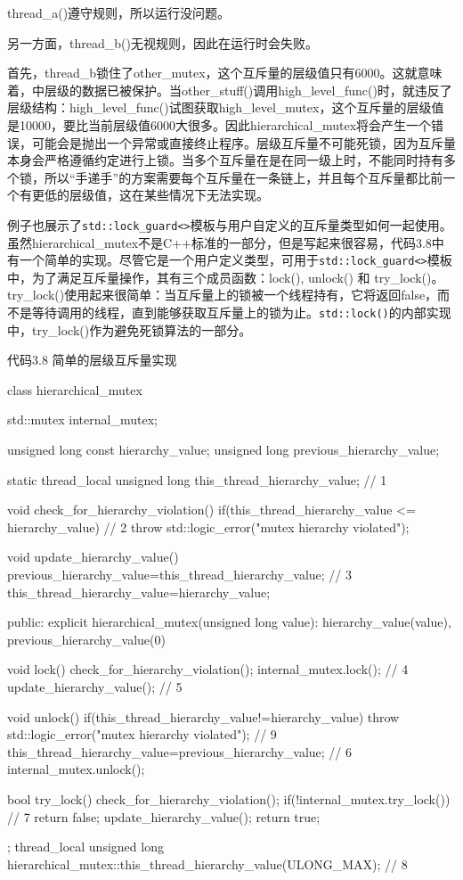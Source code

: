 thread\_a()遵守规则，所以运行没问题。

另一方面，thread\_b()无视规则，因此在运行时会失败。

首先，thread\_b锁住了other\_mutex，这个互斥量的层级值只有6000。这就意味着，中层级的数据已被保护。当other\_stuff()调用high\_level\_func()时，就违反了层级结构：high\_level\_func()试图获取high\_level\_mutex，这个互斥量的层级值是10000，要比当前层级值6000大很多。因此hierarchical\_mutex将会产生一个错误，可能会是抛出一个异常或直接终止程序。层级互斥量不可能死锁，因为互斥量本身会严格遵循约定进行上锁。当多个互斥量在是在同一级上时，不能同时持有多个锁，所以“手递手”的方案需要每个互斥量在一条链上，并且每个互斥量都比前一个有更低的层级值，这在某些情况下无法实现。

例子也展示了\texttt{std::lock\_guard<>}模板与用户自定义的互斥量类型如何一起使用。虽然hierarchical\_mutex不是C++标准的一部分，但是写起来很容易，代码3.8中有一个简单的实现。尽管它是一个用户定义类型，可用于\texttt{std::lock\_guard<>}模板中，为了满足互斥量操作，其有三个成员函数：lock(), unlock() 和 try\_lock()。try\_lock()使用起来很简单：当互斥量上的锁被一个线程持有，它将返回false，而不是等待调用的线程，直到能够获取互斥量上的锁为止。\texttt{std::lock()}的内部实现中，try\_lock()作为避免死锁算法的一部分。

代码3.8 简单的层级互斥量实现

\begin{cpp}
class hierarchical_mutex
{
  std::mutex internal_mutex;

  unsigned long const hierarchy_value;
  unsigned long previous_hierarchy_value;

  static thread_local unsigned long this_thread_hierarchy_value;  // 1

  void check_for_hierarchy_violation()
  {
    if(this_thread_hierarchy_value <= hierarchy_value)  // 2
    {
      throw std::logic_error("mutex hierarchy violated");
    }
  }

  void update_hierarchy_value()
  {
    previous_hierarchy_value=this_thread_hierarchy_value;  // 3
    this_thread_hierarchy_value=hierarchy_value;
  }

public:
  explicit hierarchical_mutex(unsigned long value):
      hierarchy_value(value),
      previous_hierarchy_value(0)
  {}

  void lock()
  {
    check_for_hierarchy_violation();
    internal_mutex.lock();  // 4
    update_hierarchy_value();  // 5
  }

  void unlock()
  {
    if(this_thread_hierarchy_value!=hierarchy_value)
      throw std::logic_error("mutex hierarchy violated");  // 9
    this_thread_hierarchy_value=previous_hierarchy_value;  // 6
    internal_mutex.unlock();
  }

  bool try_lock()
  {
    check_for_hierarchy_violation();
    if(!internal_mutex.try_lock())  // 7
      return false;
    update_hierarchy_value();
    return true;
  }
};
thread_local unsigned long
     hierarchical_mutex::this_thread_hierarchy_value(ULONG_MAX);  // 8
\end{cpp}

